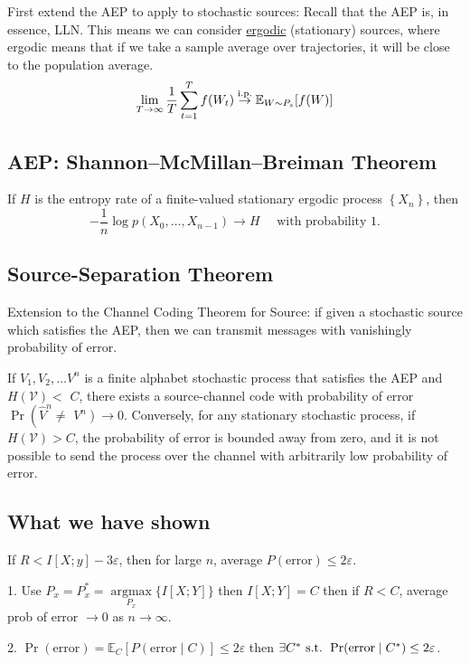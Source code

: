 First extend the AEP to apply to stochastic sources: Recall that the AEP is, in essence, LLN. This means we can consider \underline{ergodic} (stationary) sources, where ergodic means that if we take a sample average over trajectories, it will be close to the population average.
\begin{align*}
    \lim_{T\to\infty}\frac{1}{T}\sum_{t=1}^{T} f(W_t) \stackrel{\text{i.p.}}{\to} \mathbb{E}_{W\sim P_s}[f(W)]
\end{align*}

\subsection{AEP: Shannon–McMillan–Breiman Theorem}
If $H$ is the entropy rate of a finite-valued stationary ergodic process $\left\{X_n\right\}$, then
$$
-\frac{1}{n} \log p\left(X_0, \ldots, X_{n-1}\right) \rightarrow H \quad \text { with probability } 1 .
$$

\subsection{Source-Separation Theorem}
Extension to the Channel Coding Theorem for Source: if given a stochastic source which satisfies the AEP, then we can transmit messages with vanishingly probability of error.

If $V_1, V_2, \ldots V^n$ is a finite alphabet stochastic process that satisfies the AEP and $H(\mathcal{V})<$ $C$, there exists a source-channel code with probability of error $\operatorname{Pr}\left(\hat{V}^n \neq\right.$ $\left.V^n\right) \rightarrow 0$. Conversely, for any stationary stochastic process, if $H(\mathcal{V})>C$, the probability of error is bounded away from zero, and it is not possible to send the process over the channel with arbitrarily low probability of error.

\subsection{What we have shown}
If $R<I[X ; y]-3 \varepsilon$, then for large $n$, average $P(\text{error})\leq 2\varepsilon$.

1. Use $P_x=P_x^*=\underset{P_x}{\operatorname{argmax}}\{I[X ; Y]\}$ then $I[X ; Y]=C$ then if $R<C$, average prob of error $\rightarrow 0$ as $n\to\infty$.

2. $\Pr(\text{error})=\mathbb{E}_{C}\left[P(\text{error} \mid C)\right] \leq 2 \varepsilon$ then $\exists C^\ast\text{ s.t. }\Pr(\text{error}\mid C^\ast)\leq 2\varepsilon$.

